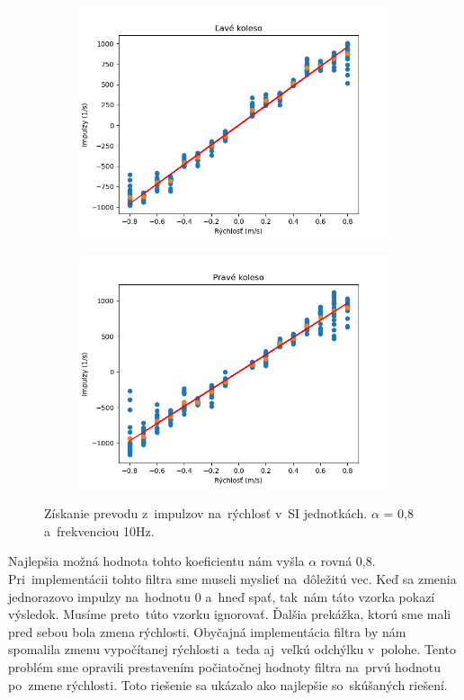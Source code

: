 \begin{figure}[!htbp]
	\begin{subfigure}{0.5\textwidth}
		\includegraphics[width=\textwidth]{img/lw_08100.png}
	\end{subfigure}
	\hfill
	\begin{subfigure}{0.5\textwidth}
		\includegraphics[width=\textwidth]{img/rw_08100.png}
	\end{subfigure}
	\caption{Získanie prevodu z~impulzov na~rýchlosť v~SI jednotkách. $\alpha$ = 0,8 a~frekvenciou 10Hz.}
	\label{fig:rw_lw_08100}
\end{figure}

Najlepšia možná hodnota tohto koeficientu nám vyšla $\alpha$ rovná 0,8. Pri~implementácii tohto filtra sme museli myslieť na~dôležitú vec.
Keď sa zmenia jednorazovo impulzy na~hodnotu 0 a~hneď spať, tak~nám táto vzorka pokazí výsledok. Musíme preto~túto vzorku ignorovať. Ďalšia
prekážka, ktorú sme mali pred sebou bola zmena rýchlosti. Obyčajná implementácia filtra by nám spomalila zmenu vypočítanej rýchlosti
a~teda aj~veľkú odchýlku v~polohe. Tento problém sme opravili prestavením počiatočnej hodnoty filtra na~prvú hodnotu po~zmene rýchlosti.
Toto riešenie sa ukázalo ako najlepšie so~skúšaných riešení.

